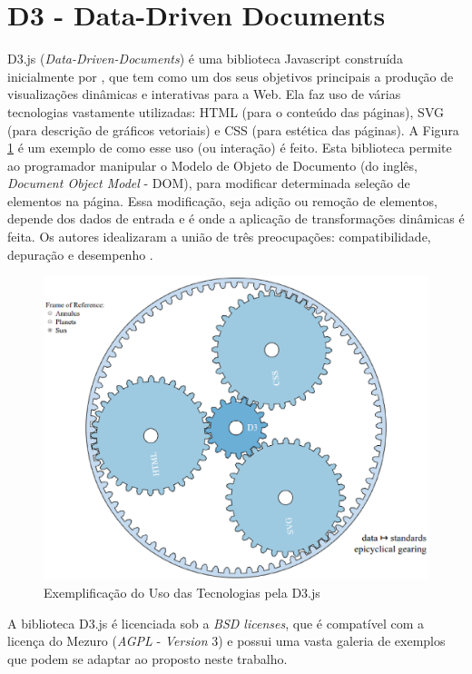 \newpage

\section{D3 - Data-Driven Documents}

D3.js (\textit{Data-Driven-Documents}) é uma biblioteca Javascript construída
inicialmente por , que tem como um dos seus objetivos
principais a produção de visualizações dinâmicas e interativas para a Web. Ela
faz uso de várias tecnologias vastamente utilizadas: HTML (para o conteúdo das
páginas), SVG (para descrição de gráficos vetoriais) e CSS (para estética das
páginas). A Figura \ref{fig:d3_gears} é um exemplo de como esse uso (ou
interação) é feito. Esta biblioteca permite ao programador manipular o Modelo de
Objeto de Documento (do inglês, \textit{Document Object Model} - DOM), para
modificar determinada seleção de elementos na página. Essa modificação, seja
adição ou remoção de elementos, depende dos dados de entrada e é onde a
aplicação de transformações dinâmicas é feita. Os autores idealizaram a união de
três preocupações: compatibilidade, depuração e desempenho \cite{bostock2011d3}.

\begin{figure}[!htb]
	\centering
    \includegraphics[keepaspectratio=true,scale=0.5]
    {figuras/d3_gears.eps}
  \caption{Exemplificação do Uso das Tecnologias pela D3.js \cite{michaeld3}}
  \label{fig:d3_gears}
\end{figure}

A biblioteca D3.js é licenciada sob a \textit{BSD licenses}, que é compatível
com a licença do Mezuro (\textit{AGPL} - \textit{Version} 3) e possui uma vasta
galeria de exemplos que podem se adaptar ao proposto neste trabalho.

